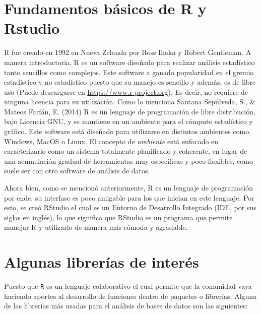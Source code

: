\documentclass[
  12pt,
]{book}
\begin{document}
\hypertarget{fundamentos-buxe1sicos-de-r-y-rstudio}{%
\section{Fundamentos básicos de R y Rstudio}\label{fundamentos-buxe1sicos-de-r-y-rstudio}}

R fue creado en 1992 en Nueva Zelanda por Ross Ihaka y Robert Gentleman. A manera introductoria, R es un software diseñado para realizar análisis estadístico tanto sencillos como complejos. Este software a ganado popularidad en el gremio estadístico y no estadístico puesto que su manejo es sencillo y además, es de libre uso (Puede descargarse en \url{https://www.r-project.org}). Es decir, no requiere de ninguna licencia para su utilización. Como lo menciona Santana Sepúlveda, S., \& Mateos Farfán, E. (2014) R es un lenguaje de programación de libre distribución, bajo Licencia GNU, y se mantiene en un ambiente para el cómputo estadístico y gráfico. Este software está diseñado para utilizarse en distintos ambientes como, Windows, MacOS o Linux. El concepto de \emph{ambiente} está enfocado en caracterizarlo como un sistema totalmente planificado y coherente, en lugar de una acumulación gradual de herramientas muy específicas y poco flexibles, como suele ser con otro software de análisis de datos.

Ahora bien, como se mencionó anteriormente, R es un lenguaje de programación por ende, su interfase es poco amigable para los que inician en este lenguaje. Por esto, se creó RStudio el cual es un Entorno de Desarrollo Integrado (IDE, por sus siglas en inglés), lo que significa que RStudio es un programa que permite manejar R y utilizarlo de manera más cómoda y agradable.

\hypertarget{algunas-libreruxedas-de-interuxe9s}{%
\section{Algunas librerías de interés}\label{algunas-libreruxedas-de-interuxe9s}}

Puesto que \texttt{R} es un lenguaje colaborativo el cual permite que la comunidad vaya haciendo aportes al desarrollo de funciones dentro de paquetes o librerías. Alguna de las librerías más usadas para el análisis de bases de datos son las siguientes:
\end{document}
